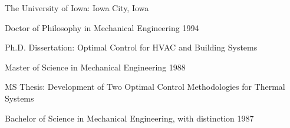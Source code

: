 

\begin{cventries}

\cvmultientry
{The University of Iowa:  Iowa City, Iowa} %
{}
{} %
{
\cvsubentry
{Doctor of Philosophy in Mechanical Engineering} %
{} %
{1994} %
{
  \begin{cvitems} %
    \item  Ph.D. Dissertation: Optimal Control for HVAC and Building Systems
  \end{cvitems}
}%
\cvsubentry
{Master of Science in Mechanical Engineering} %
{} %
{1988} %
{
  \begin{cvitems} %
    \item MS Thesis: Development of Two Optimal Control Methodologies for Thermal Systems
  \end{cvitems}
}%
\cvsubentry
{Bachelor of Science in Mechanical Engineering, with distinction} %
{} %
{1987} %
{}
}
\end{cventries}
